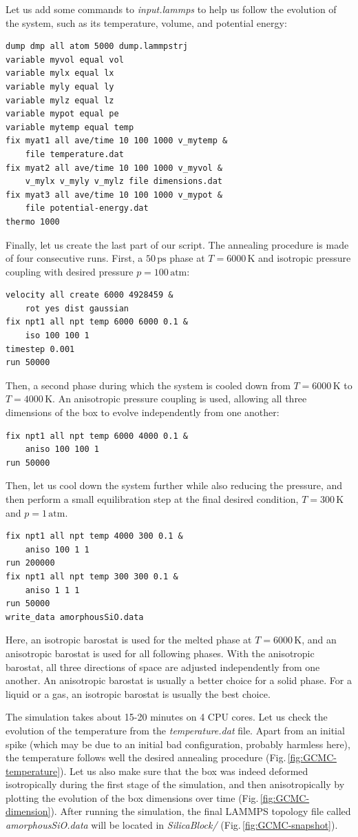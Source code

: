 \documentclass[9pt,tutorial]{livecoms}
\begin{document}
Let us add some commands to \textit{input.lammps} to help us follow the evolution of the system, such as its temperature, volume, and potential energy:
{\normalsize \begin{verbatim}
dump dmp all atom 5000 dump.lammpstrj
variable myvol equal vol
variable mylx equal lx
variable myly equal ly
variable mylz equal lz
variable mypot equal pe
variable mytemp equal temp
fix myat1 all ave/time 10 100 1000 v_mytemp &
    file temperature.dat
fix myat2 all ave/time 10 100 1000 v_myvol &
    v_mylx v_myly v_mylz file dimensions.dat
fix myat3 all ave/time 10 100 1000 v_mypot &
    file potential-energy.dat
thermo 1000
\end{verbatim}}
Finally, let us create the last part of our script. The annealing procedure is made of four consecutive runs. First, a $50\,\text{ps}$ phase at $T = 6000\,\text{K}$ and isotropic pressure coupling with desired pressure $p = 100\,\text{atm}$:
{\normalsize \begin{verbatim}
velocity all create 6000 4928459 &
    rot yes dist gaussian
fix npt1 all npt temp 6000 6000 0.1 &
    iso 100 100 1
timestep 0.001
run 50000
\end{verbatim}}
Then, a second phase during which the system is cooled down from $T = 6000\,\text{K}$ to $T = 4000\,\text{K}$. An anisotropic pressure coupling is used, allowing all three dimensions of the box to evolve independently from one another:
{\normalsize \begin{verbatim}
fix npt1 all npt temp 6000 4000 0.1 &
    aniso 100 100 1
run 50000
\end{verbatim}}
Then, let us cool down the system further while also reducing the pressure, and then perform a small equilibration step at the final desired condition, $T = 300\,\text{K}$ and $p = 1\,\text{atm}$.
{\normalsize \begin{verbatim}
fix npt1 all npt temp 4000 300 0.1 &
    aniso 100 1 1
run 200000
fix npt1 all npt temp 300 300 0.1 &
    aniso 1 1 1
run 50000
write_data amorphousSiO.data
\end{verbatim}}
Here, an isotropic barostat is used for the melted phase at $T = 6000\,\text{K}$, and an anisotropic barostat is used for all following phases. With the anisotropic barostat, all three directions of space are adjusted independently from one another. An anisotropic barostat is usually a better choice for a solid phase. For a liquid or a gas, an isotropic barostat is usually the best choice.

The simulation takes about 15-20 minutes on 4 CPU cores. Let us check the evolution of the temperature from the \textit{temperature.dat} file. Apart from an initial spike (which may be due to an initial bad configuration, probably harmless here), the temperature follows well the desired annealing procedure  (Fig.\,\ref{fig:GCMC-temperature}). Let us also make sure that the box was indeed deformed isotropically during the first stage of the simulation, and then anisotropically by plotting the evolution of the box dimensions over time (Fig.\,\ref{fig:GCMC-dimension}). After running the simulation, the final LAMMPS topology file called \textit{amorphousSiO.data} will be located in \textit{SilicaBlock/} (Fig.\,\ref{fig:GCMC-snapshot}).
\end{document}
